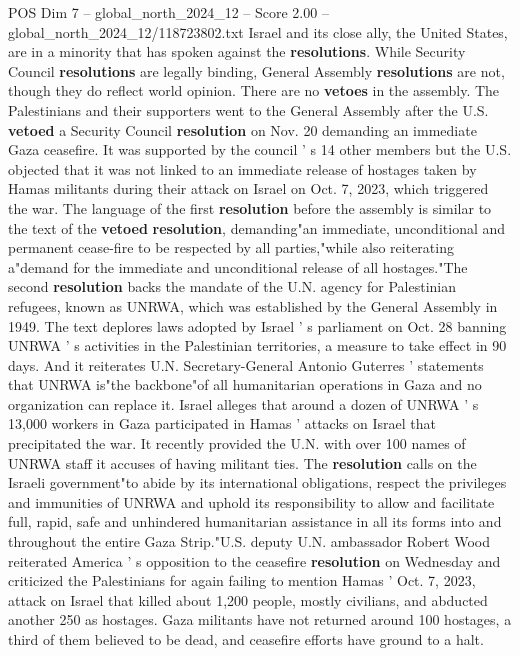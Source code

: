 \begin{textsample}{POS Dim 7 – global\_north\_2024\_12 – Score 2.00 – global\_north\_2024\_12/118723802.txt}  \label{ex:f7_pos_298}
Israel and its close ally, the United States, are in a minority that has spoken against the \textbf{resolutions}.
While Security Council \textbf{resolutions} are legally binding, General Assembly \textbf{resolutions} are not, though they do reflect world opinion.
There are no \textbf{vetoes} in the assembly.
The Palestinians and their supporters went to the General Assembly after the U.S. \textbf{vetoed} a Security Council \textbf{resolution} on Nov. 20 demanding an immediate Gaza ceasefire.
It was supported by the council ' s 14 other members but the U.S. objected that it was not linked to an immediate release of hostages taken by Hamas militants during their attack on Israel on Oct. 7, 2023, which triggered the war.
The language of the first \textbf{resolution} before the assembly is similar to the text of the \textbf{vetoed} \textbf{resolution}, demanding"an immediate, unconditional and permanent cease-fire to be respected by all parties,"while also reiterating a"demand for the immediate and unconditional release of all hostages."The second \textbf{resolution} backs the mandate of the U.N. agency for Palestinian refugees, known as UNRWA, which was established by the General Assembly in 1949.
The text deplores laws adopted by Israel ' s parliament on Oct. 28 banning UNRWA ' s activities in the Palestinian territories, a measure to take effect in 90 days.
And it reiterates U.N.
Secretary-General Antonio Guterres ' statements that UNRWA is"the backbone"of all humanitarian operations in Gaza and no organization can replace it.
Israel alleges that around a dozen of UNRWA ' s 13,000 workers in Gaza participated in Hamas ' attacks on Israel that precipitated the war.
It recently provided the U.N. with over 100 names of UNRWA staff it accuses of having militant ties.
The \textbf{resolution} calls on the Israeli government"to abide by its international obligations, respect the privileges and immunities of UNRWA and uphold its responsibility to allow and facilitate full, rapid, safe and unhindered humanitarian assistance in all its forms into and throughout the entire Gaza Strip."U.S. deputy U.N. ambassador Robert Wood reiterated America ' s opposition to the ceasefire \textbf{resolution} on Wednesday and criticized the Palestinians for again failing to mention Hamas ' Oct. 7, 2023, attack on Israel that killed about 1,200 people, mostly civilians, and abducted another 250 as hostages.
Gaza militants have not returned around 100 hostages, a third of them believed to be dead, and ceasefire efforts have ground to a halt.

\end{textsample}
